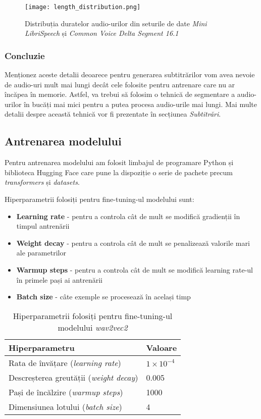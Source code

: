 \begin{figure}[h]
    \centering
    \texttt{[image: length\_distribution.png]}
    \caption{Distribuția duratelor audio-urilor din seturile de date \textit{Mini LibriSpeech} și \textit{Common Voice Delta Segment 16.1}}
    \label{fig:length-distribution}
\end{figure}

\subsubsection{Concluzie}
Menționez aceste detalii deoarece pentru generarea subtitrărilor vom avea nevoie de audio-uri
mult mai lungi decât cele folosite pentru antrenare care nu ar încăpea în memorie. Astfel, va trebui
să folosim o tehnică de segmentare a audio-urilor în bucăți mai mici pentru a putea procesa
audio-urile mai lungi. Mai multe detalii despre această tehnică vor fi prezentate în secțiunea
\textit{Subtitrări}.

\subsection{Antrenarea modelului}
Pentru antrenarea modelului am folosit limbajul de programare Python și biblioteca Hugging Face
care pune la dispoziție o serie de pachete precum \textit{transformers} și \textit{datasets}.
\par
Hiperparametrii folosiți pentru fine-tuning-ul modelului sunt:
\begin{itemize}
    \item \textbf{Learning rate} - pentru a controla cât de mult se modifică gradienții în timpul
    antrenării 
    \item \textbf{Weight decay} - pentru a controla cât de mult se penalizează valorile mari ale
    parametrilor 
    \item \textbf{Warmup steps} - pentru a controla cât de mult se modifică learning rate-ul în
    primele pași ai antrenării
    \item \textbf{Batch size} - câte exemple se procesează în același timp
\end{itemize}

\vspace{0.5em}

\begin{table}[h]
    \centering
    \label{tab:hyperparameters}
    \begin{tabular}{ll}
    \hline
    \textbf{Hiperparametru} & \textbf{Valoare} \\ \hline
    Rata de învățare (\textit{learning rate}) & $1 \times 10^{-4}$ \\
    Descreșterea greutății (\textit{weight decay}) & 0.005 \\
    Pași de încălzire (\textit{warmup steps}) & 1000 \\
    Dimensiunea lotului (\textit{batch size}) & 4 \\ \hline
    \end{tabular}
    \caption{Hiperparametrii folosiți pentru fine-tuning-ul modelului \textit{wav2vec2}}
\end{table}


